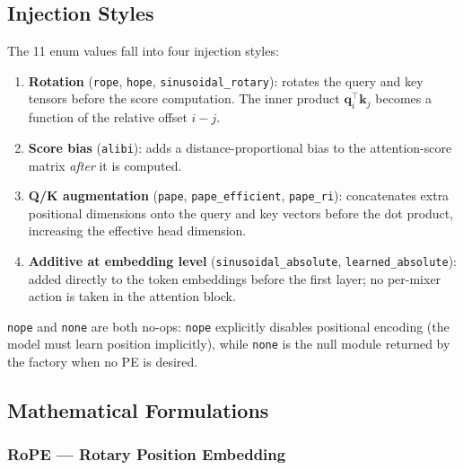 \subsection{Injection Styles}

The 11 enum values fall into four injection styles:

\begin{enumerate}
\item \textbf{Rotation} (\texttt{rope}, \texttt{hope},
   \texttt{sinusoidal\_rotary}): rotates the query and key tensors
   before the score computation. The inner product
   $\mathbf{q}_i^\top\mathbf{k}_j$ becomes a function of the relative
   offset $i-j$.
\item \textbf{Score bias} (\texttt{alibi}): adds a distance-proportional
   bias to the attention-score matrix \emph{after} it is computed.
\item \textbf{Q/K augmentation} (\texttt{pape}, \texttt{pape\_efficient},
   \texttt{pape\_ri}): concatenates extra positional dimensions onto the
   query and key vectors before the dot product, increasing the
   effective head dimension.
\item \textbf{Additive at embedding level} (\texttt{sinusoidal\_absolute},
   \texttt{learned\_absolute}): added directly to the token embeddings
   before the first layer; no per-mixer action is taken in the
   attention block.
\end{enumerate}

\texttt{nope} and \texttt{none} are both no-ops: \texttt{nope} explicitly
disables positional encoding (the model must learn position implicitly),
while \texttt{none} is the null module returned by the factory when no
PE is desired.

\subsection{Mathematical Formulations}

\subsubsection{RoPE --- Rotary Position Embedding}

